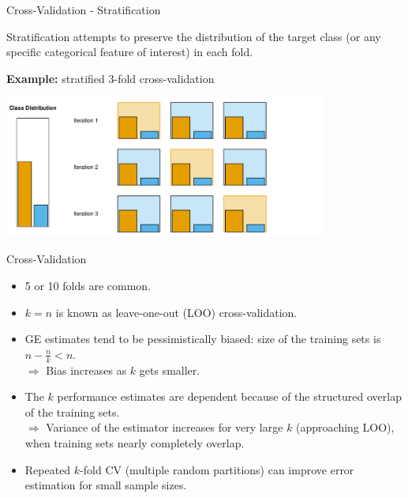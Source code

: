\begin{vbframe}{Cross-Validation - Stratification}

Stratification attempts to preserve the distribution of the target class (or any 
specific categorical feature of interest) in each fold.

\lz

\textbf{Example:} stratified 3-fold cross-validation

\lz

\begin{knitrout}\scriptsize
{}\color{fgcolor}

{\centering \includegraphics[width=0.8\textwidth]{figure/eval_resample_1} 

}

\end{knitrout}
\end{vbframe}




\begin{vbframe}{Cross-Validation}

\begin{itemize}
  \item 5 or 10 folds are common.%
  \item $k = n$ is known as leave-one-out (LOO) cross-validation.
  \item GE estimates tend to be pessimistically biased: 
  size of the training sets is $ n- \tfrac{n}{k} < n$. \\
  $\Rightarrow$ Bias increases as $k$ gets smaller.
  \item The $k$ performance estimates are dependent because
  of the structured overlap of the training sets.\\
  $\Rightarrow$ Variance of the estimator increases for very large $k$ 
  (approaching LOO), when training sets nearly completely overlap.
  \item Repeated $k$-fold CV (multiple random partitions)
  can improve error estimation for small sample sizes.
\end{itemize}
\end{vbframe}


